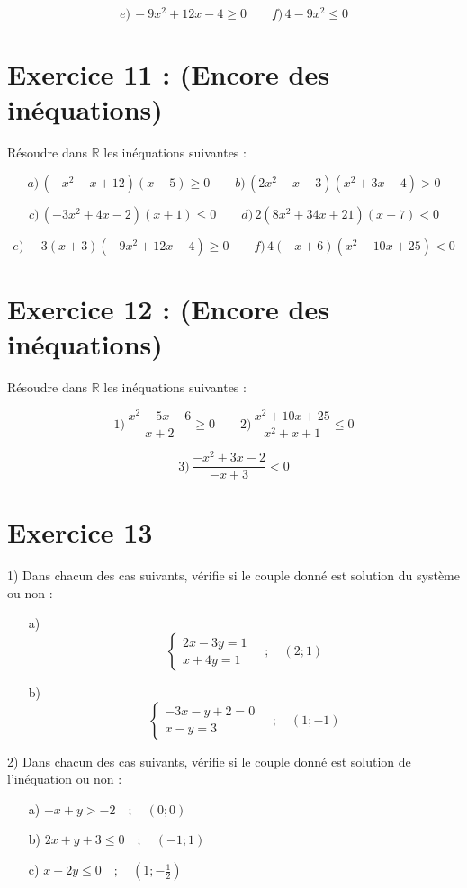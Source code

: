 \documentclass[12pt]{article}
\begin{document}
\[
e) \, -9x^2 + 12x - 4 \geq 0 \quad\quad f) \, 4 - 9x^2 \leq 0
\]

\section*{Exercice 11 : (Encore des inéquations)}

Résoudre dans \( \mathbb{R} \) les inéquations suivantes :

\[
a) \, (-x^2 - x + 12)(x - 5) \geq 0 \quad\quad b) \, (2x^2 - x - 3)(x^2 + 3x - 4) > 0
\]

\[
c) \, (-3x^2 + 4x - 2)(x + 1) \leq 0 \quad\quad d) \, 2(8x^2 + 34x + 21)(x + 7) < 0
\]

\[
e) \, -3(x + 3)(-9x^2 + 12x - 4) \geq 0 \quad\quad f) \, 4(-x + 6)(x^2 - 10x + 25) < 0
\]

\section*{Exercice 12 : (Encore des inéquations)}

Résoudre dans \( \mathbb{R} \) les inéquations suivantes :

\[
1) \, \frac{x^2 + 5x - 6}{x + 2} \geq 0 \quad\quad 2) \, \frac{x^2 + 10x + 25}{x^2 + x + 1} \leq 0
\]

\[
3) \, \frac{-x^2 + 3x - 2}{-x + 3} < 0
\]

\section*{Exercice 13}

1) Dans chacun des cas suivants, vérifie si le couple donné est solution du système ou non :
\begin{itemize}
    \item[a)] 
    \[
    \begin{cases}
        2x - 3y = 1 \\
        x + 4y = 1
    \end{cases}
    \quad ; \quad (2; 1)
    \]
    \item[b)]
    \[
    \begin{cases}
        -3x - y + 2 = 0 \\
        x - y = 3
    \end{cases}
    \quad ; \quad (1; -1)
    \]
\end{itemize}

2) Dans chacun des cas suivants, vérifie si le couple donné est solution de l’inéquation ou non :
\begin{itemize}
    \item[a)] 
    \(-x + y > -2 \quad ; \quad (0; 0)\)
    \item[b)] 
    \(2x + y + 3 \leq 0 \quad ; \quad (-1; 1)\)
    \item[c)]
    \(x + 2y \leq 0 \quad ; \quad (1; -\frac{1}{2})\)
\end{itemize}
\end{document}
